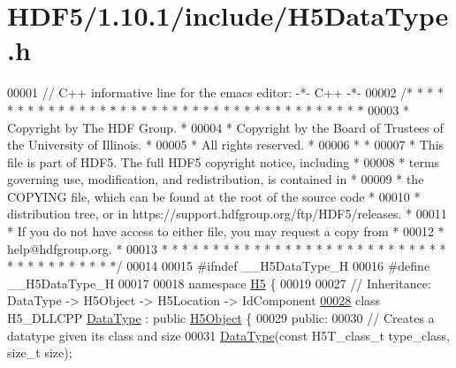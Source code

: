 \hypertarget{_h_d_f5_21_810_81_2include_2_h5_data_type_8h_source}{}\section{H\+D\+F5/1.10.1/include/\+H5\+Data\+Type.h}
\label{_h_d_f5_21_810_81_2include_2_h5_data_type_8h_source}

\begin{DoxyCode}
00001 \textcolor{comment}{// C++ informative line for the emacs editor: -*- C++ -*-}
00002 \textcolor{comment}{/* * * * * * * * * * * * * * * * * * * * * * * * * * * * * * * * * * * * * * *}
00003 \textcolor{comment}{ * Copyright by The HDF Group.                                               *}
00004 \textcolor{comment}{ * Copyright by the Board of Trustees of the University of Illinois.         *}
00005 \textcolor{comment}{ * All rights reserved.                                                      *}
00006 \textcolor{comment}{ *                                                                           *}
00007 \textcolor{comment}{ * This file is part of HDF5.  The full HDF5 copyright notice, including     *}
00008 \textcolor{comment}{ * terms governing use, modification, and redistribution, is contained in    *}
00009 \textcolor{comment}{ * the COPYING file, which can be found at the root of the source code       *}
00010 \textcolor{comment}{ * distribution tree, or in https://support.hdfgroup.org/ftp/HDF5/releases.  *}
00011 \textcolor{comment}{ * If you do not have access to either file, you may request a copy from     *}
00012 \textcolor{comment}{ * help@hdfgroup.org.                                                        *}
00013 \textcolor{comment}{ * * * * * * * * * * * * * * * * * * * * * * * * * * * * * * * * * * * * * * */}
00014 
00015 \textcolor{preprocessor}{#ifndef \_\_H5DataType\_H}
00016 \textcolor{preprocessor}{#define \_\_H5DataType\_H}
00017 
00018 \textcolor{keyword}{namespace }\hyperlink{namespace_h5}{H5} \{
00019 
00027 \textcolor{comment}{//  Inheritance: DataType -> H5Object -> H5Location -> IdComponent}
\hyperlink{class_h5_1_1_data_type}{00028} \textcolor{keyword}{class }H5\_DLLCPP \hyperlink{class_h5_1_1_data_type}{DataType} : \textcolor{keyword}{public} \hyperlink{class_h5_1_1_h5_object}{H5Object} \{
00029    \textcolor{keyword}{public}:
00030         \textcolor{comment}{// Creates a datatype given its class and size}
00031         \hyperlink{class_h5_1_1_data_type}{DataType}(\textcolor{keyword}{const} H5T\_class\_t type\_class, \textcolor{keywordtype}{size\_t} size);

\end{DoxyCode}

